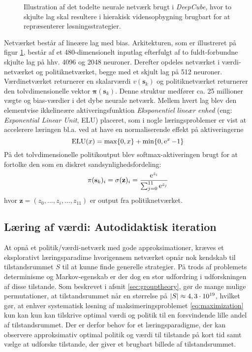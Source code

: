 \documentclass[../main.tex]{subfiles}
\begin{document}
\begin{figure}[H]
	\centering

\caption{Illustration af det todelte neurale netværk brugt i \textit{DeepCube}, hvor to skjulte lag skal resultere i hierakisk vidensopbygning brugbart for at repræsenterer løsningsstrategier.}
\label{fig:DNN}
\end{figure}
\noindent Netværket består af lineære lag med bias.  Arkitekturen, som er illustreret på figur \ref{fig:DNN}, består af et 480-dimensionelt inputlag efterfulgt af to fuldt-forbundne skjulte lag på hhv. 4096 og 2048 neuroner. Derefter opdeles netværket i værdi-netværket og politiknetværket, begge med et skjult lag på 512 neuroner. Værdinetværket returnerer en skalarværdi \(v(\mathbf s_k)\) og politiknetværket returnerer den tolvdimensionelle vektor \(\bm \pi (\mathbf s_k)\). Denne struktur medfører ca. 25 millioner vægte og bias-værdier i det dybe neurale netværk. Mellem hvert lag blev den elementvise ikkelineære aktiveringsfunktion \textit{Eksponentiel lineær enhed} (eng: \textit{Exponential Linear Unit}, ELU) placeret, som i nogle læringsproblemer er vist at accelerere læringen bl.a. ved at have en normaliserende effekt på aktiveringerne \cite{ELU} 
\[
\operatorname{ELU}(x) = \operatorname*{max}\{0, x\} + \operatorname{min}\{0, \operatorname{e}^{x} -1\}
\]
På det tolvdimensionelle politikoutput blev softmax-aktiveringen brugt for at fortolke den som en diskret sandsynlighedsfordeling:
\[
\pi(\mathbf s_k)_i = \sigma(\mathbf z)_i = \frac{\operatorname{e}^{z_i}}{\sum_{j=0}^{11} \operatorname{e}^{z_j}}
\]
hvor \(\mathbf z=(z_0, ..., z_i, ..., z_{11})\) er output fra politiknetværket.

\subsection*{Læring af værdi: Autodidaktisk iteration}
At opnå et politik/værdi-netværk med gode approksimationer, kræves et eksplorativt læringsparadime hvorigennem netværket opnår nok kendskab til tilstandsrummet \(S\) til at kunne finde generelle strategier. 
På trods af problemets determinisme og Markov-egenskab er der dog en stor udfordring i udforskningen af disse tilstande.
Som beskrevet i afsnit \ref{sec:grouptheory}, gør de mange mulige permutationer, at tilstandsrummet når en størrelse på \(|S|\approx 4,3\cdot10^{19}\), hvilket gør, at enhver systematisk løsning af maksimeringsproblemet \ref{eq:maximization} kun kan kun kan tilskrive optimal værdi og politik til en forsvindende lille andel af tilstandsrummet.
Der er derfor behov for et læringsparadigme, der kan observere approksimativ optimal politik og værdi til tilstande på kort tid samt vælge at udforske tilstande, der giver et brugbart billede af tilstandsrummet.
\end{document}
